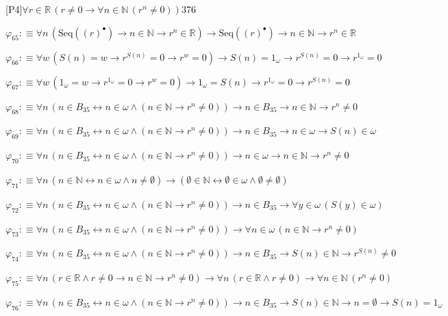 \begin{fullproof}{[P4]}{$\forall r \in \mathbb{R}\,(r \neq 0 \to \forall n \in \mathbb{N}\,({{r}^{n}} \neq 0))$}{376}
\begin{abbrevlist}
\item $\varphi_{65} :\equiv \forall n\,(\mathrm{Seq}({(r)^{\bullet}}) \to n \in \mathbb{N} \to {{r}^{n}} \in \mathbb{R}) \to \mathrm{Seq}({(r)^{\bullet}}) \to n \in \mathbb{N} \to {{r}^{n}} \in \mathbb{R}$
\item $\varphi_{66} :\equiv \forall w\,(S(n) = w \to {{r}^{S(n)}} = 0 \to {{r}^{w}} = 0) \to S(n) = 1_{\omega} \to {{r}^{S(n)}} = 0 \to {{r}^{1_{\omega}}} = 0$
\item $\varphi_{67} :\equiv \forall w\,(1_{\omega} = w \to {{r}^{1_{\omega}}} = 0 \to {{r}^{w}} = 0) \to 1_{\omega} = S(n) \to {{r}^{1_{\omega}}} = 0 \to {{r}^{S(n)}} = 0$
\item $\varphi_{68} :\equiv \forall n\,(n \in B_{35} \leftrightarrow n \in \omega \land (n \in \mathbb{N} \to {{r}^{n}} \neq 0)) \to n \in B_{35} \to n \in \mathbb{N} \to {{r}^{n}} \neq 0$
\item $\varphi_{69} :\equiv \forall n\,(n \in B_{35} \leftrightarrow n \in \omega \land (n \in \mathbb{N} \to {{r}^{n}} \neq 0)) \to n \in B_{35} \to n \in \omega \to S(n) \in \omega$
\item $\varphi_{70} :\equiv \forall n\,(n \in B_{35} \leftrightarrow n \in \omega \land (n \in \mathbb{N} \to {{r}^{n}} \neq 0)) \to n \in \omega \to n \in \mathbb{N} \to {{r}^{n}} \neq 0$
\item $\varphi_{71} :\equiv \forall n\,(n \in \mathbb{N} \leftrightarrow n \in \omega \land n \neq \emptyset) \to (\emptyset \in \mathbb{N} \leftrightarrow \emptyset \in \omega \land \emptyset \neq \emptyset)$
\item $\varphi_{72} :\equiv \forall n\,(n \in B_{35} \leftrightarrow n \in \omega \land (n \in \mathbb{N} \to {{r}^{n}} \neq 0)) \to n \in B_{35} \to \forall y \in \omega\,(S(y) \in \omega)$
\item $\varphi_{73} :\equiv \forall n\,(n \in B_{35} \leftrightarrow n \in \omega \land (n \in \mathbb{N} \to {{r}^{n}} \neq 0)) \to \forall n \in \omega\,(n \in \mathbb{N} \to {{r}^{n}} \neq 0)$
\item $\varphi_{74} :\equiv \forall n\,(n \in B_{35} \leftrightarrow n \in \omega \land (n \in \mathbb{N} \to {{r}^{n}} \neq 0)) \to n \in B_{35} \to S(n) \in \mathbb{N} \to {{r}^{S(n)}} \neq 0$
\item $\varphi_{75} :\equiv \forall n\,(r \in \mathbb{R} \land r \neq 0 \to n \in \mathbb{N} \to {{r}^{n}} \neq 0) \to \forall n\,(r \in \mathbb{R} \land r \neq 0) \to \forall n \in \mathbb{N}\,({{r}^{n}} \neq 0)$
\item $\varphi_{76} :\equiv \forall n\,(n \in B_{35} \leftrightarrow n \in \omega \land (n \in \mathbb{N} \to {{r}^{n}} \neq 0)) \to n \in B_{35} \to S(n) \in \mathbb{N} \to n = \emptyset \to S(n) = 1_{\omega}$

\end{abbrevlist}
\end{fullproof}
